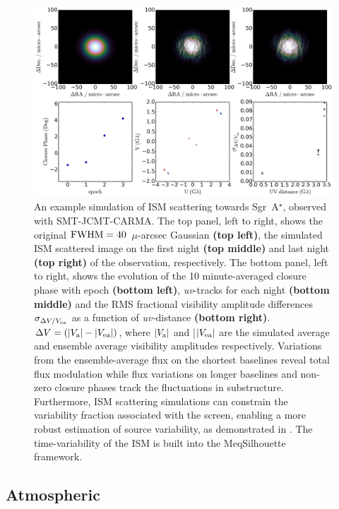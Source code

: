 \begin{figure}
\begin{center}
\includegraphics[width=1.8\columnwidth]{Images/ism}
\caption{An example simulation of ISM scattering towards Sgr~A$^{\star}$, observed with SMT-JCMT-CARMA.  The top panel, left to right, shows the original $\rm FWHM = 40$~$\mu$-arcsec Gaussian {\bf (top left)}, the simulated ISM scattered image on the first night {\bf (top middle)} and last night {\bf (top right)} of the observation, respectively.  The bottom panel, left to right,  shows the evolution of the 10 minute-averaged closure phase with epoch {\bf (bottom left)}, {\sl uv}-tracks for each night {\bf (bottom middle)} and the RMS fractional visibility amplitude differences $\sigma_{\Delta V /V_{\rm ea}}$ as a function of {\sl uv-}distance {\bf (bottom right)}. $ \Delta V= (|V_{\rm a}|-|V_{\rm ea}|)$, where $|V_{\rm a}|$ and |$|V_{\rm ea}|$ are the simulated average and ensemble average visibility amplitudes respectively. Variations from the ensemble-average flux on the shortest baselines reveal total flux modulation while flux variations on longer baselines and non-zero closure phases track the fluctuations in substructure.  Furthermore, ISM scattering simulations can constrain the variability fraction associated with the screen, enabling a more robust estimation of source variability, as demonstrated in \citet{2016arXiv160106571O}. The time-variability of the ISM is built into the {\sc MeqSilhouette} framework.\label{ISM_sequence}%
}
\end{center}
\end{figure}


\subsection{Atmospheric}


